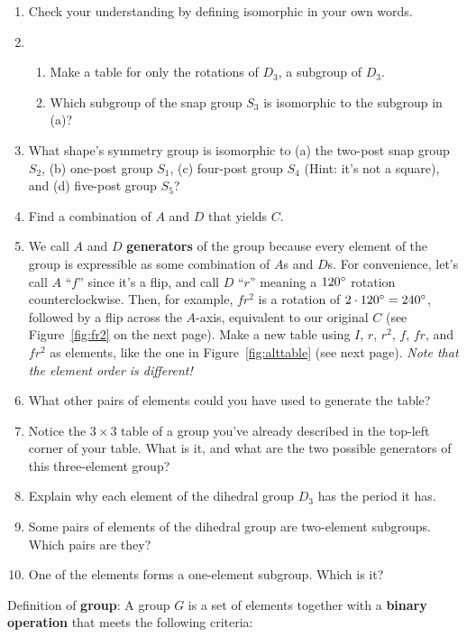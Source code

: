 \documentclass[../gatm.tex]{subfiles}
\begin{document}
\begin{enumerate}
\setcounter{enumi}{\theenumLast}
\item Check your understanding by defining isomorphic in your own words.
\item \begin{enumerate}
\item Make a table for only the rotations of $D_3$, a subgroup of $D_3$.
\item Which subgroup of the snap group $S_3$ is isomorphic to the subgroup in (a)?
\end{enumerate}
\item What shape's symmetry group is isomorphic to (a) the two-post snap group $S_2$, (b) one-post group $S_1$, (c) four-post group $S_4$ (Hint: it's not a square), and (d) five-post group $S_5$? %
\item Find a combination of $A$ and $D$ that yields $C$.
\item We call $A$ and $D$ \textbf{generators} of the group because every element of the group is expressible as some combination of $A$s and $D$s. For convenience, let's call $A$ ``$f$'' since it's a flip, and call $D$ ``$r$'' meaning a $120^\circ$ rotation counterclockwise. Then, for example, $fr^2$ is a rotation of $2\cdot 120^\circ = 240^\circ$, followed by a flip across the $A$-axis, equivalent to our original $C$ (see Figure~\ref{fig:fr2} on the next page). Make a new table using $I$, $r$, $r^2$, $f$, $fr$, and $fr^2$ as elements, like the one in Figure~\ref{fig:alttable} (see next page). \textit{Note that the element order is different!} %
\item What other pairs of elements could you have used to generate the table?
\item Notice the $3\times 3$ table of a group you've already described in the top-left corner of your table. What is it, and what are the two possible generators of this three-element group?
\item Explain why each element of the dihedral group $D_3$ has the period it has.
\item Some pairs of elements of the dihedral group are two-element subgroups. Which pairs are they?
\item One of the elements forms a one-element subgroup. Which is it?
\setcounter{enumLast}{\theenumi}
\end{enumerate}
Definition of \textbf{group}: A group $G$ is a set of elements together with a \textbf{binary operation} that meets the following criteria:
\end{document}
